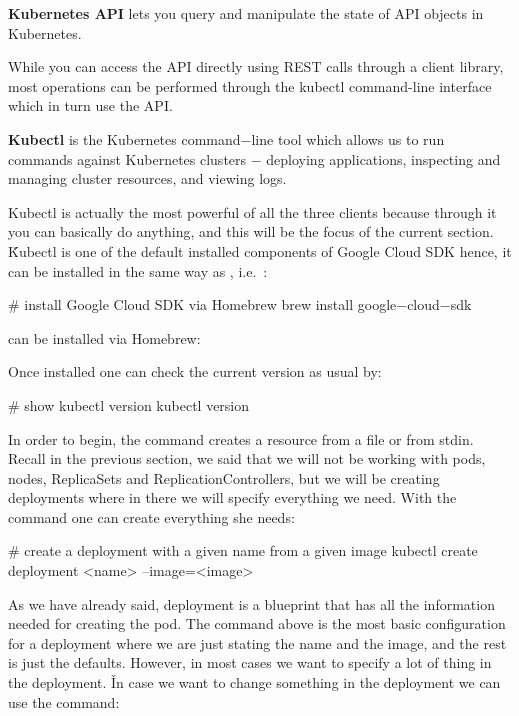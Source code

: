 \textbf{Kubernetes API} lets you query and manipulate the state of API objects in Kubernetes.
\ed

While you can access the API directly using REST calls through a client library, most operations can be performed
through the kubectl command-line interface which in turn use the API\@.

\bd[Kubectl]
\textbf{Kubectl} is the Kubernetes command$-$line tool which allows us to run commands against Kubernetes clusters $-$
deploying applications, inspecting and managing cluster resources, and viewing logs.
\ed

Kubectl is actually the most powerful of all the three clients because through it you can basically do anything, and
this will be the focus of the current section. \v

Kubectl is one of the default installed components of Google Cloud SDK hence, it can be installed in the same way as
, i.e.\ :
\begin{bash}
# install Google Cloud SDK via Homebrew
brew install google$-$cloud$-$sdk
\end{bash} can be installed via Homebrew:

Once installed one can check the current version as usual by:
\begin{bash}
# show kubectl version
kubectl version
\end{bash}

In order to begin, the  command creates a resource from a file or from stdin. Recall in the
previous section, we said that we will not be working with pods, nodes, ReplicaSets and ReplicationControllers, but
we will be creating deployments where in there we will specify everything we need. With the  command one can create everything she needs:

\begin{bash}
# create a deployment with a given name from a given image
kubectl create deployment <name> --image=<image>
\end{bash}

As we have already said, deployment is a blueprint that has all the information needed for creating the pod. The
command above is the most basic configuration for a deployment where we are just stating the name and the image, and
the rest is just the defaults. However, in most cases we want to specify a lot of thing in the deployment. \v

In case we want to change something in the deployment we can use the  command:

